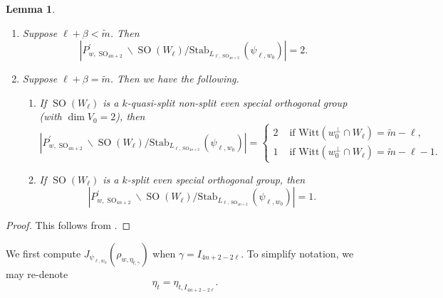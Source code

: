 \documentclass[12pt]{amsart}
\newtheorem{lemma}[theorem]{Lemma}
\theoremstyle{remark}
\DeclareMathOperator{\SO}{SO}
\begin{document}
\begin{lemma}
\label{lemma-double-coset2}
\begin{enumerate}
\item Suppose $\ell+\beta<\tilde{m}$. Then 
\begin{equation*}
	| P_{w,\SO_{4n+2}}^\prime\backslash \SO(W_{\ell}) / \mathrm{Stab}_{L_{\ell,\SO_{4n+2}}}(\psi_{\ell, w_0}) | =2.
\end{equation*}

\item Suppose $\ell+\beta=\tilde{m}$. Then we have the following.

\begin{enumerate}

\item 	If $\SO(W_{\ell})$ is a $k$-quasi-split non-split even special orthogonal group (with $\dim V_0=2$), then
\begin{equation*}
	| P_{w,\SO_{4n+2}}^\prime\backslash \SO(W_{\ell}) / \mathrm{Stab}_{L_{\ell,\SO_{4n+2}}}(\psi_{\ell, w_0}) | = \begin{cases}
2  & \text{ if } \mathrm{Witt}(w_0^\perp \cap W_{\ell})=\tilde{m}-\ell,  \\
 1	 & \text{ if } \mathrm{Witt}(w_0^\perp \cap W_{\ell})=\tilde{m}-\ell-1.
 \end{cases}
\end{equation*}

\item If $\SO(W_{\ell})$ is a $k$-split even special orthogonal group, then 
\begin{equation*}
	| P_{w,\SO_{4n+2}}^\prime\backslash \SO(W_{\ell}) / \mathrm{Stab}_{L_{\ell,\SO_{4n+2}}}(\psi_{\ell, w_0}) | =1.
\end{equation*}
\end{enumerate}
\end{enumerate}
\end{lemma}

\begin{proof}
This follows from \cite[Proposition 4.4]{GinzburgRallisSoudry2011}.	
\end{proof}





We first compute $J_{\psi_{\ell, w_0}}(\rho_{w,\eta_{t,\gamma}})$ when $\gamma=I_{4n+2-2\ell}$. To simplify notation, we may re-denote
\begin{equation*}
\eta_{t}=\eta_{t,I_{4n+2-2\ell}}.	
\end{equation*}
\end{document}
